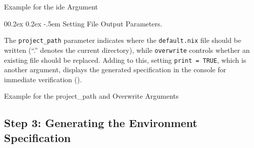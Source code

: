 \documentclass[
  man,
  longtable,
  nolmodern,
  notxfonts,
  notimes,
  colorlinks=true,linkcolor=blue,citecolor=blue,urlcolor=blue]{apa7}
\makeatletter
\renewcommand{\paragraph}{\@startsection{paragraph}{4}{\parindent}%
	{0\baselineskip \@plus 0.2ex \@minus 0.2ex}%
	{-.5em}%
	{\normalfont\normalsize\bfseries\typesectitle}}
\newenvironment{Shaded}{\begin{snugshade}}{\end{snugshade}}
\newcommand{\ConstantTok}[1]{\textcolor[rgb]{0.56,0.35,0.01}{#1}}
\newcommand{\NormalTok}[1]{\textcolor[rgb]{0.00,0.23,0.31}{#1}}
\newcommand{\OtherTok}[1]{\textcolor[rgb]{0.00,0.23,0.31}{#1}}
\newcommand{\StringTok}[1]{\textcolor[rgb]{0.13,0.47,0.30}{#1}}
\makeatother
\begin{document}
\begin{codelisting}

\caption{\label{lst-ide-example}Example for the ide Argument}

\centering{

\begin{Shaded}
\begin{Highlighting}[]
\NormalTok{ide }\OtherTok{=} \StringTok{"rstudio"}
\end{Highlighting}
\end{Shaded}

}

\end{codelisting}%

\normalsize

\paragraph{Setting File Output
Parameters.}\label{setting-file-output-parameters}

The \texttt{project\_path} parameter indicates where the
\texttt{default.nix} file should be written (``.'' denotes the current
directory), while \texttt{overwrite} controls whether an existing file
should be replaced. Adding to this, setting \texttt{print\ =\ TRUE},
which is another argument, displays the generated specification in the
console for immediate verification
().

\small

\begin{codelisting}

\caption{\label{lst-file-output-example}Example for the project\_path
and Overwrite Arguments}

\centering{

\begin{Shaded}
\begin{Highlighting}[]
\NormalTok{project\_path }\OtherTok{=} \StringTok{"."}\NormalTok{,}
\NormalTok{overwrite }\OtherTok{=} \ConstantTok{TRUE}
\end{Highlighting}
\end{Shaded}

}

\end{codelisting}%

\normalsize

\subsection{Step 3: Generating the Environment
Specification}\label{step-3-generating-the-environment-specification}
\end{document}

